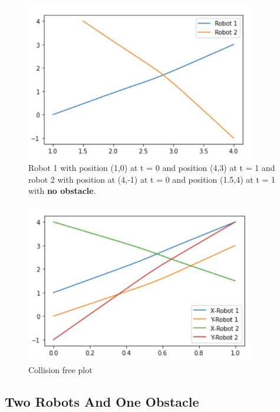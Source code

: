 \begin{figure}[H]
    \centering
    \includegraphics[width=10cm]{Graphs/Two Robots Intersecting (1).png}
    \caption{Robot 1 with position (1,0) at t = 0 and position (4,3) at t = 1 and robot 2 with position at (4,-1) at t = 0 and position (1.5,4) at t = 1 with \textbf{no obstacle}.}
    \label{fig:my_label}
\end{figure}




\begin{figure}[H]
    \centering
    \includegraphics[width=10cm]{Graphs/Two Robots Intersecting (2).png}
    \caption{Collision free plot}
    \label{fig:my_label}
\end{figure}




\subsection{Two Robots And One Obstacle}


